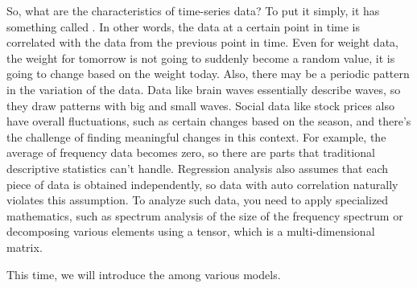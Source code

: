 \documentclass{ltjsbook}
\begin{document}
So, what are the characteristics of time-series data? To put it simply, it has something called . In other words, the data at a certain point in time is correlated with the data from the previous point in time. Even for weight data, the weight for tomorrow is not going to suddenly become a random value, it is going to change based on the weight today. Also, there may be a periodic pattern in the variation of the data. Data like brain waves essentially describe waves, so they draw patterns with big and small waves. Social data like stock prices also have overall fluctuations, such as certain changes based on the season, and there's the challenge of finding meaningful changes in this context. For example, the average of frequency data becomes zero, so there are parts that traditional descriptive statistics can't handle. Regression analysis also assumes that each piece of data is obtained independently, so data with auto correlation naturally violates this assumption. To analyze such data, you need to apply specialized mathematics, such as spectrum analysis of the size of the frequency spectrum or decomposing various elements using a tensor, which is a multi-dimensional matrix.


This time, we will introduce the  among various models.
\end{document}
